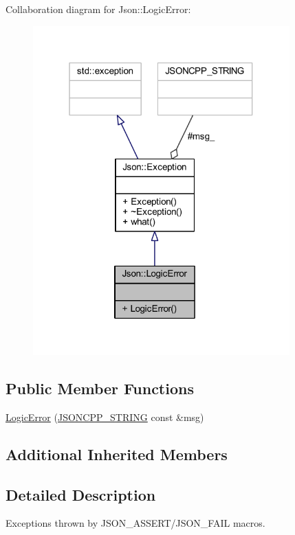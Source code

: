 Collaboration diagram for Json\+:\+:Logic\+Error\+:\nopagebreak
\begin{figure}[H]
\begin{center}
\leavevmode
\includegraphics[width=280pt]{class_json_1_1_logic_error__coll__graph}
\end{center}
\end{figure}
\subsection*{Public Member Functions}
\begin{DoxyCompactItemize}
\item 
\hyperlink{class_json_1_1_logic_error_acca679aa49768a4a1de7b705c67c2919}{Logic\+Error} (\hyperlink{json_8h_a1e723f95759de062585bc4a8fd3fa4be}{J\+S\+O\+N\+C\+P\+P\+\_\+\+S\+T\+R\+I\+NG} const \&msg)
\end{DoxyCompactItemize}
\subsection*{Additional Inherited Members}


\subsection{Detailed Description}
Exceptions thrown by J\+S\+O\+N\+\_\+\+A\+S\+S\+E\+R\+T/\+J\+S\+O\+N\+\_\+\+F\+A\+IL macros.

